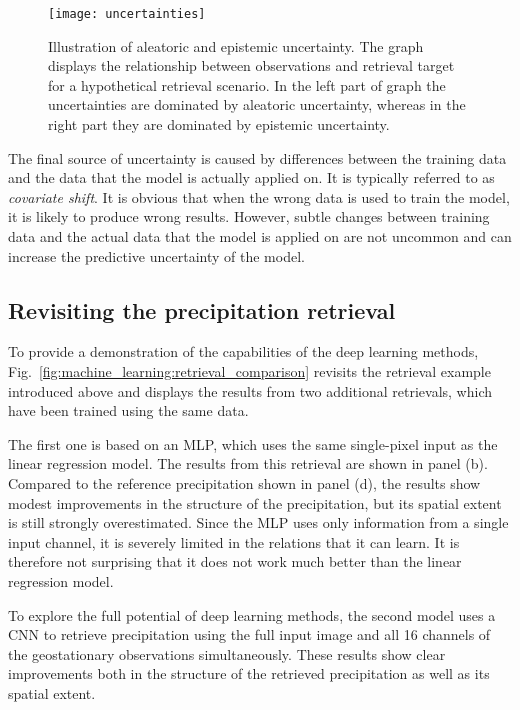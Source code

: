\begin{figure}
  \centering
  \texttt{[image: uncertainties]}
  \caption{
    Illustration of aleatoric and epistemic uncertainty. The graph
    displays the relationship between observations and retrieval target
    for a hypothetical retrieval scenario. In the left part of graph the
    uncertainties are dominated by aleatoric uncertainty, whereas in
    the right part they are dominated by epistemic uncertainty.
  }
  \label{fig:machine_learning:uncertainties}
\end{figure}

The final source of uncertainty is caused by differences between the training
data and the data that the model is actually applied on. It is typically
referred to as \textit{covariate shift}. It is obvious that when the wrong data
is used to train the model, it is likely to produce wrong results. However,
subtle changes between training data and the actual data that the model is
applied on are not uncommon and can  increase the predictive uncertainty of
the model.

\subsection{Revisiting the precipitation retrieval}

To provide a demonstration of the capabilities of the deep learning methods,
Fig.~\ref{fig:machine_learning:retrieval_comparison} revisits
the retrieval example introduced above and displays the results from two additional
retrievals, which have been trained using the same data.

The first one is based on an MLP, which uses the same single-pixel input as the
linear regression model. The results from this retrieval are shown in panel (b).
Compared to the reference precipitation shown in panel (d), the results show
modest improvements in the structure of the precipitation, but its spatial
extent is still strongly overestimated. Since the MLP uses only information from
a single input channel, it is severely limited in the relations that it can
learn. It is therefore not surprising that it does not work much better than the
linear regression model.

To explore the full potential of deep learning methods, the second model uses a
CNN to retrieve precipitation using the full input image and all 16 channels of
the geostationary observations simultaneously. These results show clear
improvements both in the structure of the retrieved precipitation as well as its
spatial extent.

